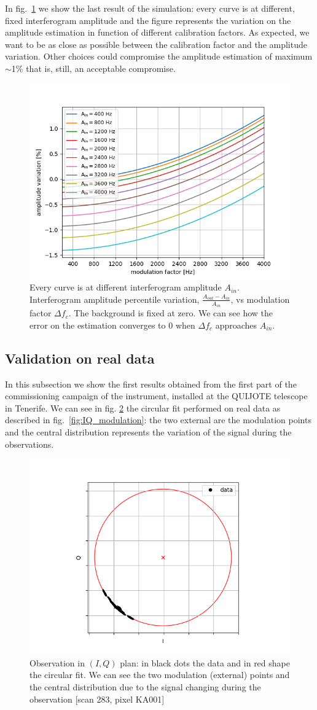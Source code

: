 \documentclass[twocolumn,traditabstract]{aa}\\
\begin{document}
\noindent In fig.~\ref{fig:amp_mod} we show the last result of the simulation: every curve is at different, fixed interferogram amplitude and the figure represents the variation on the amplitude estimation in function of different calibration factors. As expected, we want to be as close as possible between the calibration factor and the amplitude variation. Other choices could compromise the amplitude estimation of maximum $\sim$1\% that is, still, an acceptable compromise.

\begin{figure}[htf]
	\centering
 	\includegraphics[width=.5\textwidth]{3.acqui/several_modulations.png}
	\caption{Every curve is at different interferogram amplitude $A_{in}$. Interferogram amplitude percentile variation, $\frac{A_{out}-A_{in}}{A_{in}}$, vs modulation factor $\Delta f_c$.  The background is fixed at zero. We can see how the error on the estimation converges to 0 when $\Delta f_c$ approaches $A_{in}$. }
	\label{fig:amp_mod}
\end{figure}


\subsection{Validation on real data}
In this subsection we show the first results obtained from the first part of the commissioning campaign of the instrument, installed at the QUIJOTE telescope in Tenerife. We can see in fig. \ref{fig:circle} the circular fit performed on real data as described in fig.~\ref{fig:IQ_modulation}: the two external are the modulation points and the central distribution represents the variation of the signal during the observations.


\begin{figure}[htf]
	\centering
	\includegraphics[width=.5\textwidth]{4.results/circular_fit.png}
	\caption{Observation in $(I,Q)$ plan: in black dots the data and in red shape the circular fit. We can see the two modulation (external) points and the central distribution due to the signal changing during the observation [scan 283, pixel KA001]}
	\label{fig:circle}
\end{figure}
\end{document}
